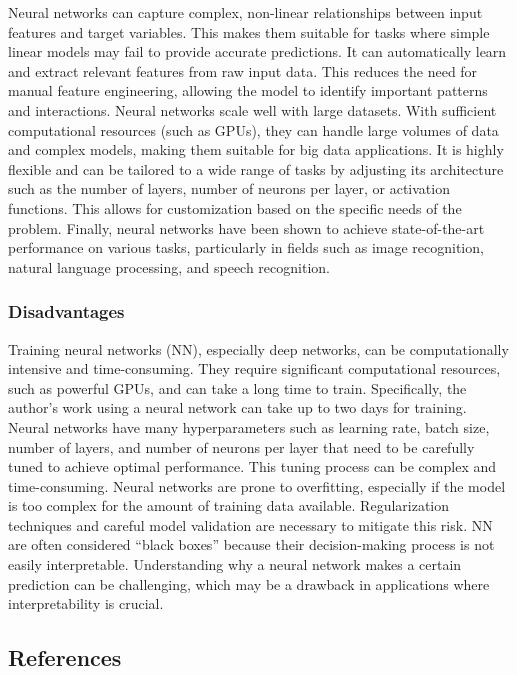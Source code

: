 \documentclass{article}
\begin{document}
Neural networks can capture complex, non-linear relationships between
input features and target variables. This makes them suitable for tasks
where simple linear models may fail to provide accurate predictions. It
can automatically learn and extract relevant features from raw input
data. This reduces the need for manual feature engineering, allowing the
model to identify important patterns and interactions. Neural networks
scale well with large datasets. With sufficient computational resources
(such as GPUs), they can handle large volumes of data and complex
models, making them suitable for big data applications. It is highly
flexible and can be tailored to a wide range of tasks by adjusting its
architecture such as the number of layers, number of neurons per layer,
or activation functions. This allows for customization based on the
specific needs of the problem. Finally, neural networks have been shown
to achieve state-of-the-art performance on various tasks, particularly
in fields such as image recognition, natural language processing, and
speech recognition.

\subsubsection{Disadvantages}\label{disadvantages}

Training neural networks (NN), especially deep networks, can be
computationally intensive and time-consuming. They require significant
computational resources, such as powerful GPUs, and can take a long time
to train. Specifically, the author's work using a neural network can
take up to two days for training. Neural networks have many
hyperparameters such as learning rate, batch size, number of layers, and
number of neurons per layer that need to be carefully tuned to achieve
optimal performance. This tuning process can be complex and
time-consuming. Neural networks are prone to overfitting, especially if
the model is too complex for the amount of training data available.
Regularization techniques and careful model validation are necessary to
mitigate this risk. NN are often considered ``black boxes'' because
their decision-making process is not easily interpretable. Understanding
why a neural network makes a certain prediction can be challenging,
which may be a drawback in applications where interpretability is
crucial.

\subsection{References}\label{references}
\end{document}
